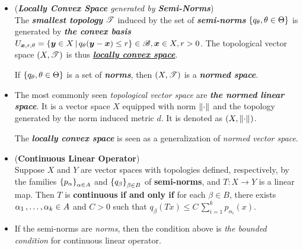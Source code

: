 \documentclass[11pt]{article}
\begin{document}
\begin{itemize}
\item \begin{definition} (\emph{\textbf{Locally Convex Space} generated by \textbf{Semi-Norms}})\\
The \emph{\textbf{smallest topology}} ${\mathscr T}$ induced by the set of \emph{\textbf{semi-norms}} $\left\{q_{\theta},\theta\in \Theta\right\}$ is generated by \emph{\textbf{the convex basis}} $U_{\boldsymbol{x},r,\theta} = \left\{\boldsymbol{y}\in X\,|\, q_{\theta}(\boldsymbol{y}-\boldsymbol{x}) \le r \right\}\in {\mathscr B}, \boldsymbol{x}\in X, r>0$. The topological vector space $(X, {\mathscr T})$ is thus \underline{\emph{\textbf{locally convex space}}}. 

If $\left\{q_{\theta},\theta\in \Theta\right\}$ is a set of \emph{\textbf{norms}}, then $(X, {\mathscr T})$ is a \emph{\textbf{normed space}}. 
\end{definition}



\item \begin{remark}
The most commonly seen \emph{topological vector space} are \emph{\textbf{the normed linear space}}. It is a vector space $X$ equipped with norm $\left\|\cdot\right\|_{}$ and the topology generated by the norm induced metric $d$. It is denoted as $(X, \left\|\cdot\right\|_{})$. 

The \emph{\textbf{locally convex space}} is seen as a generalization of \emph{normed vector space}.
\end{remark}

\item \begin{proposition} (\textbf{Continuous Linear Operator}) \citep{folland2013real}\\
Suppose $X$ and $Y$ are vector spaces with topologies defined, respectively, by the families $\left\{p_{\alpha}\right\}_{\alpha\in A}$ and $\left\{q_{\beta}\right\}_{\beta \in B}$ of \textbf{semi-norms}, and $T: X \rightarrow Y$ is a linear map. Then $T$ is \textbf{continuous} \textbf{if and only if} for each $\beta \in B$, there exists $\alpha_1 \,{,}\ldots{,}\, \alpha_k \in A$ and $C > 0$ such that $q_{\beta}(T x) \le C\, \sum_{i=1}^{k}p_{\alpha_i}(x)$.
\end{proposition}

\item \begin{remark}
If the semi-norms are \emph{norms}, then the condition above is \emph{the bounded condition} for continuous linear operator.
\end{remark}


\end{itemize}
\end{document}
